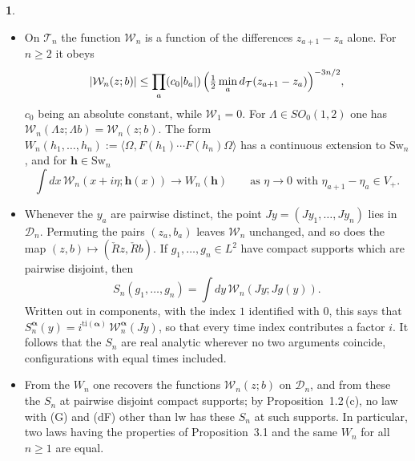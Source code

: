 \documentclass[11pt]{amsart}
\newcommand{\namedhead}{}
\theoremstyle{definition}
\newtheorem*{namedinner}{\namedhead}
\newenvironment{named}[1]{\renewcommand{\namedhead}{#1}\begin{namedinner}}{\end{namedinner}}
\begin{document}
\begin{named}{Theorem 3.3}
\begin{itemize}
\begin{itemize}
\item[(f1)] On $\mathcal T_n$ the function $\mathcal W_n$ is a function of the differences $z_{a+1}-z_a$ alone.
For $n\ge2$ it obeys
\begin{equation*}
|\mathcal W_n(z;b)|\le\prod_a(c_0|b_a|)\,\Bigl(\tfrac12\min_ad_{\mathcal T}(z_{a+1}-z_a)\Bigr)^{-3n/2},
\end{equation*}
$c_0$ being an absolute constant, while $\mathcal W_1=0$.
For $\Lambda\in SO_0(1,2)$ one has $\mathcal W_n(\Lambda z;\Lambda b)=\mathcal W_n(z;b)$.
The form $W_n(h_1,\allowbreak \dots,\allowbreak h_n):=\allowbreak \langle\Omega,\allowbreak F(h_1)\cdots F(h_n)\Omega\rangle$ has a continuous extension to $\mathrm{Sw}_n$, and for $\mathbf h\in\mathrm{Sw}_n$
\begin{equation*}
\int dx\,\mathcal W_n(x+i\eta;\mathbf h(x))\to W_n(\mathbf h)\qquad\text{as }\eta\to0\text{ with }\eta_{a+1}-\eta_a\in V_+.
\end{equation*}
\item[(f2)] Whenever the $y_a$ are pairwise distinct, the point $Jy=(Jy_1,\dots,Jy_n)$ lies in $\mathcal D_n$.
Permuting the pairs $(z_a,b_a)$ leaves $\mathcal W_n$ unchanged, and so does the map $(z,b)\mapsto(\check Rz,\check Rb)$.
If $g_1,\dots,g_n\in L^2$ have compact supports which are pairwise disjoint, then
\begin{equation*}
S_n(g_1,\dots,g_n)=\int dy\,\mathcal W_n(Jy;Jg(y)).
\end{equation*}
Written out in components, with the index $1$ identified with $0$, this says that $S_n^{\boldsymbol\alpha}(y)=\allowbreak i^{\mathrm{ti}(\boldsymbol\alpha)}\,\allowbreak \mathcal W_n^{\boldsymbol\alpha}(Jy)$, so that every time index contributes a factor $i$.
It follows that the $S_n$ are real analytic wherever no two arguments coincide, configurations with equal times included.
\item[(f3)] From the $W_n$ one recovers the functions $\mathcal W_n(z;b)$ on $\mathcal D_n$, and from these the $S_n$ at pairwise disjoint compact supports; by Proposition~1.2\,(c), no law with (G) and (dF) other than $\mathrm{lw}$ has these $S_n$ at such supports.
In particular, two laws having the properties of Proposition~3.1 and the same $W_n$ for all $n\ge1$ are equal.
\end{itemize}
\end{itemize}
\end{named}
\end{document}
